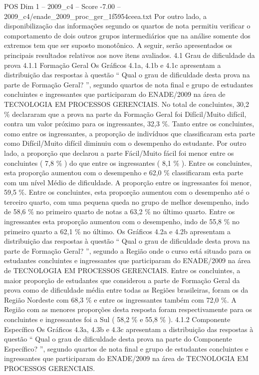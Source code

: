 \begin{textsample}{POS Dim 1 – 2009\_c4 – Score -7.00 – 2009\_c4/enade\_2009\_proc\_ger\_1f5954ceea.txt}
Por outro lado, a disponibilização das informações segundo os quartos de nota permitiu verificar o comportamento de dois outros grupos intermediários que na análise somente dos extremos tem que ser suposto monotônico.
A seguir, serão apresentados os principais resultados relativos aos nove itens avaliados. 4.1 Grau de dificuldade da prova 4.1.1 Formação Geral Os Gráficos 4.1a, 4.1b e 4.1c apresentam a distribuição das respostas à questão “ Qual o grau de dificuldade desta prova na parte de Formação Geral? ”, segundo quartos de nota final e grupo de estudantes concluintes e ingressantes que participaram do ENADE/2009 na área de TECNOLOGIA EM PROCESSOS GERENCIAIS.
No total de concluintes, 30,2 \% declararam que a prova na parte da Formação Geral foi Difícil/Muito difícil, contra um valor próximo para os ingressantes, 32,3 \%.
Tanto entre os concluintes, como entre os ingressantes, a proporção de indivíduos que classificaram esta parte como Difícil/Muito difícil diminuiu com o desempenho do estudante.
Por outro lado, a proporção que declarou a parte Fácil/Muito fácil foi menor entre os concluintes ( 7,8 \% ) do que entre os ingressantes ( 8,1 \% ).
Entre os concluintes, esta proporção aumentou com o desempenho e 62,0 \% classificaram esta parte com um nível Médio de dificuldade.
A proporção entre os ingressantes foi menor, 59,5 \%.
Entre os concluintes, esta proporção aumentou com o desempenho até o terceiro quarto, com uma pequena queda no grupo de melhor desempenho, indo de 58,6 \% no primeiro quarto de notas a 63,2 \% no último quarto.
Entre os ingressantes esta proporção aumentou com o desempenho, indo de 55,8 \% no primeiro quarto a 62,1 \% no último.
Os Gráficos 4.2a e 4.2b apresentam a distribuição das respostas à questão “ Qual o grau de dificuldade desta prova na parte de Formação Geral? ”, segundo a Região onde o curso está situado para os estudantes concluintes e ingressantes que participaram do ENADE/2009 na área de TECNOLOGIA EM PROCESSOS GERENCIAIS.
Entre os concluintes, a maior proporção de estudantes que considerou a parte de Formação Geral da prova como de dificuldade média entre todas as Regiões brasileiras, foram os da Região Nordeste com 68,3 \% e entre os ingressantes também com 72,0 \%.
A Região com as menores proporções desta resposta foram respectivamente para os concluintes e ingressantes foi a Sul ( 58,2 \% e 55,8 \% ). 4.1.2 Componente Específico Os Gráficos 4.3a, 4.3b e 4.3c apresentam a distribuição das respostas à questão “ Qual o grau de dificuldade desta prova na parte do Componente Específico? ”, segundo quartos de nota final e grupo de estudantes concluintes e ingressantes que participaram do ENADE/2009 na área de TECNOLOGIA EM PROCESSOS GERENCIAIS.

\end{textsample}
